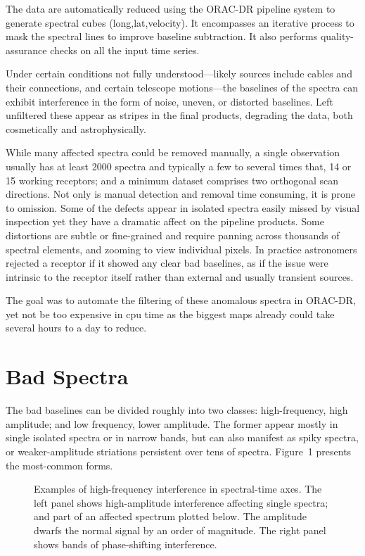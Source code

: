 The data are automatically reduced using the ORAC-DR pipeline system \citep{cavanagh_2008,jenness_2008} to generate spectral cubes (long,lat,velocity). It encompasses an iterative process to mask the spectral lines to improve baseline subtraction.  It also performs quality-assurance checks on all the input time series.

Under certain conditions not fully understood---likely sources include cables and their connections, and certain telescope motions---the baselines of the spectra can exhibit interference in the form of noise, uneven, or distorted baselines.  Left unfiltered these appear as stripes in the final products, degrading the data, both cosmetically and astrophysically.

While many affected spectra could be removed manually, a single observation usually has at least 2000 spectra and typically a few to several times that, 14 or 15 working receptors; and a minimum dataset comprises two orthogonal scan directions.  Not only is manual detection and removal time consuming, it is prone to omission.  Some of the defects appear in isolated spectra easily missed by visual inspection yet they have a dramatic affect on the pipeline products.  Some distortions are subtle or fine-grained and require panning across thousands of spectral elements, and zooming to view individual pixels. In practice astronomers rejected a receptor if it showed any clear bad baselines, as if the issue were intrinsic to the receptor itself rather than external and usually transient sources.

The goal was to automate the filtering of these anomalous spectra in ORAC-DR, yet not be too expensive in cpu time as the biggest maps already could take several hours to a day to reduce.

\section{Bad Spectra}

The bad baselines can be divided roughly into two classes: high-frequency, high amplitude; and low frequency, lower amplitude. The former appear mostly in single isolated spectra or in narrow bands, but can also manifest as spiky spectra, or weaker-amplitude striations persistent over tens of spectra.  Figure~1 presents the most-common forms.

\begin{figure}[!ht]
\caption{Examples of high-frequency interference in spectral-time axes. The left panel shows high-amplitude interference affecting single spectra; and part of an affected spectrum plotted below. The amplitude dwarfs the normal signal by an order of magnitude. The right panel shows bands of phase-shifting interference.}
\end{figure}

